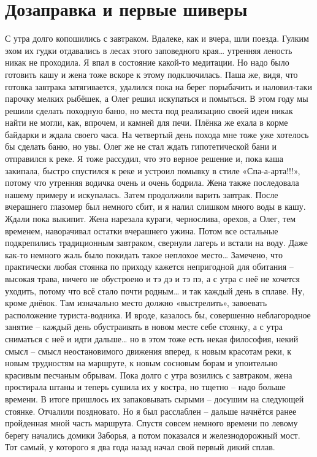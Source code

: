 \chapter{Дозаправка и первые шиверы} 

С утра долго копошились с завтраком. Вдалеке, как и вчера, шли поезда. Гулким эхом их гудки отдавались в лесах этого заповедного края… утренняя леность никак не проходила. Я впал в состояние какой-то медитации. Но надо было готовить кашу и жена тоже вскоре к этому подключилась. Паша же, видя, что готовка завтрака затягивается, удалился пока на берег порыбачить и наловил-таки парочку мелких рыбёшек, а Олег решил искупаться и помыться. 
В этом году мы решили сделать походную баню, но места под реализацию своей идеи никак найти не могли, как, впрочем, и камней для печи. Плёнка же ехала в корме байдарки и ждала своего часа. На четвертый день похода мне тоже уже хотелось бы сделать баню, но увы. Олег же не стал ждать гипотетической бани и отправился к реке. Я тоже рассудил, что это верное решение и, пока каша закипала, быстро спустился к реке и устроил помывку в стиле «Спа-а-арта!!!», потому что утренняя водичка очень и очень бодрила. Жена также последовала нашему примеру и искупалась. 
Затем продолжили варить завтрак. После вчерашнего глазомер был немного сбит, и я налил слишком много воды в кашу. Ждали пока выкипит. Жена нарезала кураги, чернослива, орехов, а Олег, тем временем, наворачивал остатки вчерашнего ужина. Потом все остальные подкрепились традиционным завтраком, свернули лагерь и встали на воду. Даже как-то немного жаль было покидать такое неплохое место… Замечено, что практически любая стоянка по приходу кажется непригодной для обитания – высокая трава, ничего не обустроено и тэ дэ и тэ пэ, а с утра с неё не хочется уходить, потому что всё стало почти родным… и так каждый день в сплаве. Ну, кроме днёвок. Там изначально место должно «выстрелить», завоевать расположение туриста-водника. И вроде, казалось бы, совершенно неблагородное занятие – каждый день обустраивать в новом месте себе стоянку, а с утра сниматься с неё и идти дальше… но в этом тоже есть некая философия, некий смысл – смысл неостановимого движения вперед, к новым красотам реки, к новым трудностям на маршруте, к новым сосновым борам и упоительно красивым песчаным обрывам.
Пока долго с утра возились с завтраком, жена простирала штаны и теперь сушила их у костра, но тщетно – надо больше времени. В итоге пришлось их запаковывать сырыми – досушим на следующей стоянке. 
Отчалили поздновато. Но я был расслаблен – дальше начнётся ранее пройденная мной часть маршрута. Спустя совсем немного времени по левому берегу начались домики Заборья, а потом показался и железнодорожный мост. Тот самый, у которого я два года назад начал свой первый дикий сплав. 
